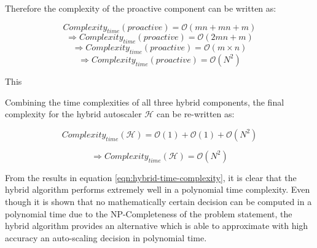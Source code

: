 Therefore the complexity of the proactive component can be written as:

\[Complexity_{time}(proactive) = \mathcal{O}(mn + mn + m)\]
\[\Rightarrow Complexity_{time}(proactive) = \mathcal{O}(2mn + m)\]
\[\Rightarrow Complexity_{time}(proactive) = \mathcal{O}(m \times n)\]
\begin{equation}
    \Rightarrow Complexity_{time}(proactive) = \mathcal{O}(N^2)
\end{equation}

This 

Combining the time complexities of all three hybrid components, the final complexity for the hybrid autoscaler $\mathcal{H}$ can be re-written as:

\[Complexity_{time}(\mathcal{H}) = \mathcal{O}(1) +  \mathcal{O}(1) + \mathcal{O}(N^2)\]

\begin{equation}
    \label{eqn:hybrid-time-complexity}
    \Rightarrow Complexity_{time}(\mathcal{H}) = \mathcal{O}(N^2)
\end{equation}

From the results in equation \ref{eqn:hybrid-time-complexity}, it is clear that the hybrid algorithm performs extremely well in a polynomial time complexity. Even though it is shown that no mathematically certain decision can be computed in a polynomial time due to the NP-Completeness of the problem statement, the hybrid algorithm provides an alternative which is able to approximate with high accuracy an auto-scaling decision in polynomial time.